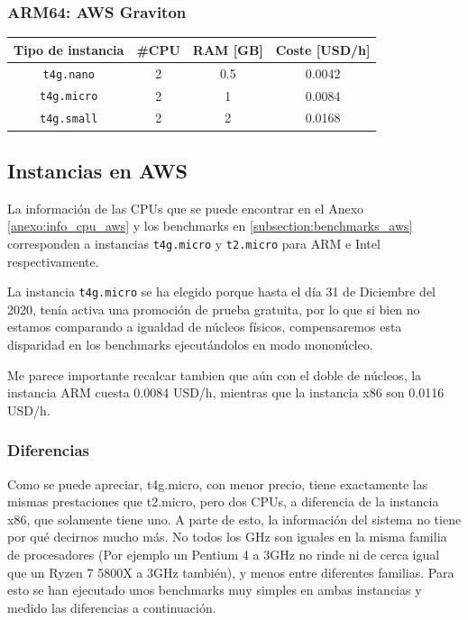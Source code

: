 \documentclass[a4paper,openright,12pt]{article}
\begin{document}
\subsubsection{ARM64: AWS Graviton}
\begin{center}
\begin{tabular}{ | c | c | c | c | }
    \hline
    Tipo de instancia       &   \#CPU   &   RAM [GB]    &   Coste [USD/h]   \\
    \hline
    \texttt{t4g.nano}       &   2       &   0.5         &   0.0042          \\
    \hline
    \texttt{t4g.micro}      &   2       &   1           &   0.0084          \\
    \hline
    \texttt{t4g.small}      &   2       &   2           &   0.0168          \\
    \hline
\end{tabular}
\end{center}

\subsection{Instancias en AWS}\label{subsection:instancias_aws}
La información de las CPUs que se puede encontrar en el Anexo \ref{anexo:info_cpu_aws} y los benchmarks en \ref{subsection:benchmarks_aws} corresponden a
instancias \texttt{t4g.micro} y \texttt{t2.micro} para ARM e Intel respectivamente.

La instancia \texttt{t4g.micro} se ha elegido porque hasta el día 31 de Diciembre del 2020, tenía activa una promoción de prueba gratuita, por lo que si bien no estamos comparando a igualdad
de núcleos físicos, compensaremos esta disparidad en los benchmarks ejecutándolos en modo mononúcleo.

Me parece importante recalcar tambien que aún con el doble de núcleos, la instancia ARM cuesta 0.0084 USD/h, mientras que la instancia x86 son 0.0116 USD/h.

\subsubsection{Diferencias}
Como se puede apreciar, t4g.micro, con menor precio, tiene exactamente las mismas prestaciones que t2.micro, pero dos CPUs, a diferencia de la instancia x86, que solamente tiene uno.
A parte de esto, la información del sistema no tiene por qué decirnos mucho más. No todos los GHz son iguales en la misma familia de procesadores (Por ejemplo un Pentium 4 a 3GHz no rinde
ni de cerca igual que un Ryzen 7 5800X a 3GHz también), y menos entre diferentes familias. Para esto se han ejecutado unos benchmarks muy simples en ambas instancias y medido las diferencias
a continuación.
\end{document}
